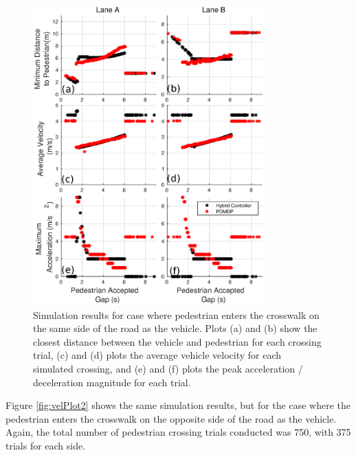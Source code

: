 \documentclass[letterpaper, 10 pt, conference]{ieeeconf}  %
\begin{document}
\begin{figure}
\centering
\includegraphics[width=3.5in]{figures/velPlotBoth.eps}
\caption{Simulation results for case where pedestrian enters the crosswalk on the same side of the road as the vehicle. Plots (a) and (b) show the closest distance between the vehicle and pedestrian for each crossing trial, (c) and (d) plots the average vehicle velocity for each simulated crossing, and (e) and (f) plots the peak acceleration / deceleration magnitude for each trial.}
\label{fig:velPlot1}
\end{figure}

Figure \ref{fig:velPlot2} shows the same simulation results, but for the case where the pedestrian enters the crosswalk on the opposite side of the road as the vehicle. Again, the total number of pedestrian crossing trials conducted was 750, with 375 trials for each side.  
\end{document}
